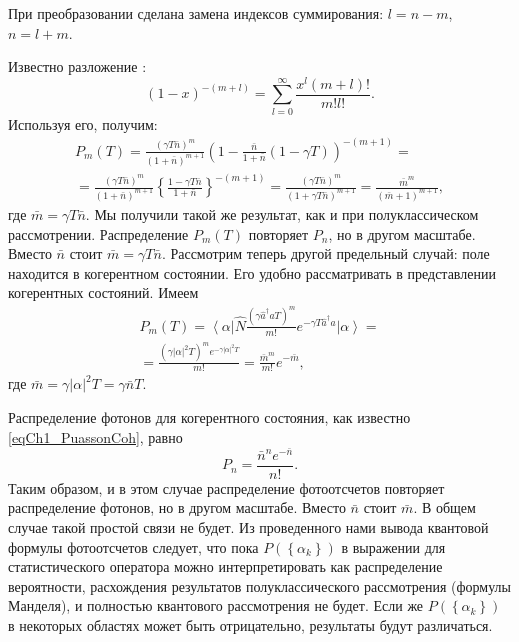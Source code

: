 При преобразовании сделана замена индексов суммирования: $l = n - m$,
$n = l + m$.

Известно разложение \cite{bDvait1973}:
\[
\left(1 - x\right)^{-\left(m + l\right)} = 
\sum_{l = 0}^\infty
\frac{x^l \left(m + l\right)!}{m! l!}.
\]
Используя его, получим:
\begin{eqnarray}
P_m\left(T\right) = 
\frac{\left(\gamma T \bar{n}\right)^m}{\left(1 + \bar{n}\right)^{m +
    1}}
\left(
1 - \frac{\bar{n}}{1 + \bar{n}}\left(1 - \gamma T\right)
\right)^{-\left(m + 1\right)} = 
\nonumber \\
=
\frac{\left(\gamma T \bar{n}\right)^m}{\left(1 + \bar{n}\right)^{m +
    1}} 
\left\{
\frac{1 - \gamma T \bar{n}}{1 + \bar{n}} 
\right\}^{-\left(m + 1\right)} = 
\frac{\left(\gamma T \bar{n}\right)^m}{\left(1 + \gamma T \bar{n}\right)^{m +
    1}} =
\frac{\bar{m}^m}{\left(\bar{m} + 1\right)^{m + 1}},
\label{eqCh4_66}
\end{eqnarray}
где $\bar{m} = \gamma T \bar{n}$.  Мы получили такой же результат, как
и при полуклассическом 
рассмотрении. Распределение $P_m\left(T\right)$ повторяет $P_n$,  но в
другом 
масштабе. Вместо $\bar{n}$ стоит $\bar{m} = \gamma T
\bar{n}$. Рассмотрим теперь другой предельный случай: поле находится в
когерентном состоянии. Его удобно рассматривать в представлении
когерентных состояний. Имеем  
\begin{eqnarray}
P_m\left(T\right) = 
\left<\alpha\right|
\hat{N}
\frac{\left(\gamma \hat{a}^{\dag} \hat{a} T\right)^m}{m!}
e^{- \gamma T \hat{a}^{\dag} \hat{a}}
\left|\alpha\right> = 
\nonumber \\
=
\frac{\left(\gamma \left|\alpha\right|^2 T\right)^m e^{-\gamma
    \left|\alpha\right|^2 T}}{m!} = 
\frac{\bar{m}^m}{m!}e^{-\bar{m}},
\label{eqCh4_67}
\end{eqnarray}
где $\bar{m} = \gamma \left|\alpha\right|^2 T = \gamma \bar{n} T$.

Распределение фотонов для когерентного состояния, как известно
\eqref{eqCh1_PuassonCoh}, 
равно  
\[
P_n = \frac{\bar{n}^n e^{-\bar{n}}}{n!}.
\]
Таким образом, и в этом случае распределение фотоотсчетов
повторяет распределение фотонов, но в другом масштабе. Вместо
$\bar{n}$ стоит $\bar{m}$.  В общем случае  такой простой связи не
будет. Из проведенного нами вывода квантовой формулы фотоотсчетов
следует, что пока $P\left(\left\{\alpha_k\right\}\right)$ в выражении 
для статистического оператора можно интерпретировать как распределение
вероятности, расхождения результатов полуклассического рассмотрения
(формулы Манделя), и полностью квантового рассмотрения не будет. Если
же $P\left(\left\{\alpha_k\right\}\right)$ в некоторых областях может
быть отрицательно, результаты будут различаться.  

